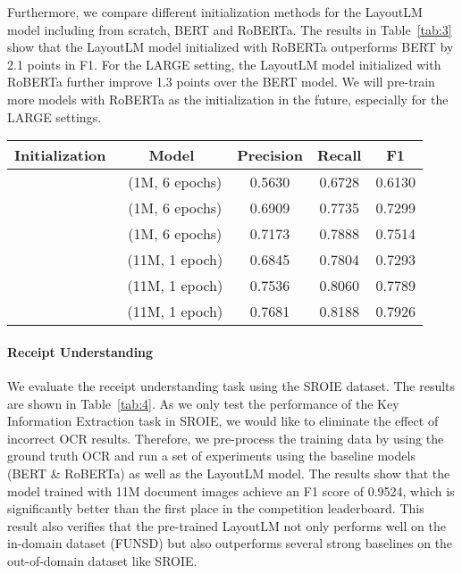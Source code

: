 \documentclass[sigconf]{acmart}
\begin{document}
Furthermore, we compare different initialization methods for the LayoutLM model including from scratch, BERT and RoBERTa. The results in Table~\ref{tab:3} show that the LayoutLM model initialized with RoBERTa outperforms BERT by 2.1 points in F1. For the LARGE setting, the LayoutLM model initialized with RoBERTa further improve 1.3 points over the BERT model. We will pre-train more models with RoBERTa as the initialization in the future, especially for the LARGE settings.

\begin{table*}[ht]
    \centering
    \begin{tabular}{ccccc}
    \toprule
     \bf Initialization &\bf Model & \bf Precision & \bf Recall & \bf F1   \\\midrule
      & ~(1M, 6 epochs)  & 0.5630  & 0.6728 & 0.6130  \\
      & ~(1M, 6 epochs)  & 0.6909  & 0.7735 & 0.7299 \\
      & ~(1M, 6 epochs)   & 0.7173 & 0.7888 & 0.7514 \\
      & ~(11M, 1 epoch) & 0.6845 & 0.7804 & 0.7293  \\
      & ~(11M, 1 epoch)  & 0.7536  & 0.8060 & 0.7789 \\
      & ~(11M, 1 epoch)   & 0.7681 & 0.8188 & 0.7926 \\
    \bottomrule
    \end{tabular}
    \caption{Different initialization methods for  and ~(Text + Layout, MVLM)}
    \label{tab:3}
\end{table*}

\paragraph{Receipt Understanding}

We evaluate the receipt understanding task using the SROIE dataset. The results are shown in Table~\ref{tab:4}. As we only test the performance of the Key Information Extraction task in SROIE, we would like to eliminate the effect of incorrect OCR results. Therefore, we pre-process the training data by using the ground truth OCR and run a set of experiments using the baseline models (BERT \& RoBERTa) as well as the LayoutLM model. The results show that the  model trained with 11M document images achieve an F1 score of 0.9524, which is significantly better than the first place in the competition leaderboard. This result also verifies that the pre-trained LayoutLM not only performs well on the in-domain dataset (FUNSD) but also outperforms several strong baselines on the out-of-domain dataset like SROIE.
\end{document}

